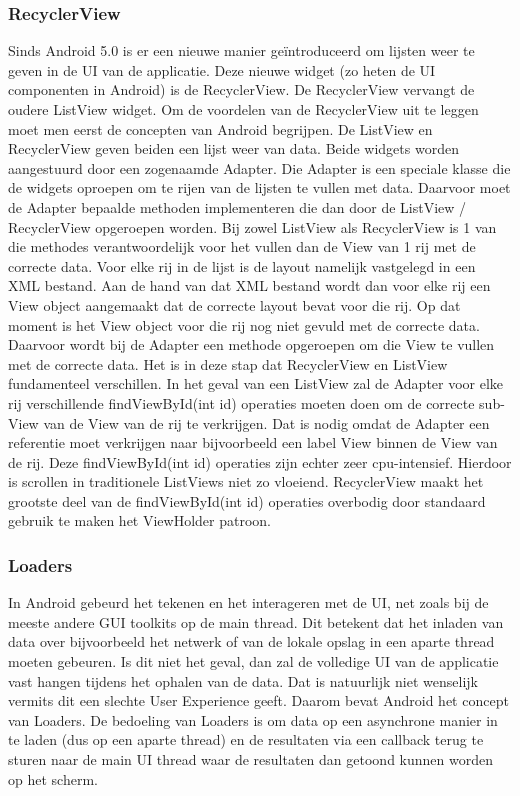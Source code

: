 \subsubsection{RecyclerView}
Sinds Android 5.0 is er een nieuwe manier geïntroduceerd om lijsten weer te geven in de UI van de applicatie. Deze nieuwe widget (zo heten de UI componenten in Android) is de RecyclerView. De RecyclerView vervangt de oudere ListView widget. Om de voordelen van de RecyclerView uit te leggen moet men eerst de concepten van Android begrijpen.
De ListView en RecyclerView geven beiden een lijst weer van data. Beide widgets worden aangestuurd door een zogenaamde Adapter. Die Adapter is een speciale klasse die de widgets oproepen om te rijen van de lijsten te vullen met data. Daarvoor moet de Adapter bepaalde methoden implementeren die dan door de ListView / RecyclerView opgeroepen worden. Bij zowel ListView als RecyclerView is 1 van die methodes verantwoordelijk voor het vullen dan de View van 1 rij met de correcte data.
Voor elke rij in de lijst is de layout namelijk vastgelegd in een XML bestand. Aan de hand van dat XML bestand wordt dan voor elke rij een View object aangemaakt dat de correcte layout bevat voor die rij. Op dat moment is het View object voor die rij nog niet gevuld met de correcte data. Daarvoor wordt bij de Adapter een methode opgeroepen om die View te vullen met de correcte data.
Het is in deze stap dat RecyclerView en ListView fundamenteel verschillen. In het geval van een ListView zal de Adapter voor elke rij verschillende findViewById(int id) operaties moeten doen om de correcte sub-View van de View van de rij te verkrijgen. Dat is nodig omdat de Adapter een referentie moet verkrijgen naar bijvoorbeeld een label View binnen de View van de rij. Deze findViewById(int id) operaties zijn echter zeer cpu-intensief. Hierdoor is scrollen in traditionele ListViews niet zo vloeiend.
RecyclerView maakt het grootste deel van de findViewById(int id) operaties overbodig door standaard gebruik te maken het ViewHolder patroon.


\subsubsection{Loaders}
In Android gebeurd het tekenen en het interageren met de UI, net zoals bij de meeste andere GUI toolkits op de main thread. Dit betekent dat het inladen van data over bijvoorbeeld het netwerk of van de lokale opslag in een aparte thread moeten gebeuren. Is dit niet het geval, dan zal de volledige UI van de applicatie vast hangen tijdens het ophalen van de data. Dat is natuurlijk niet wenselijk vermits dit een slechte User Experience geeft.
Daarom bevat Android het concept van Loaders. De bedoeling van Loaders is om data op een asynchrone manier in te laden (dus op een aparte thread) en de resultaten via een callback terug te sturen naar de main UI thread waar de resultaten dan getoond kunnen worden op het scherm. 

